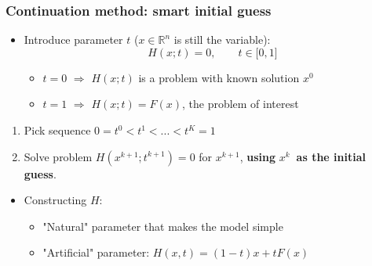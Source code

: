 \documentclass[bigger]{beamer}
\begin{document}
\begin{frame}%
\frametitle{Continuation method: smart initial guess}

\begin{itemize}
\item Introduce parameter $t$ ($x\in \mathbb{R}^{n}$ is still the variable):%
\begin{equation*}
H(x;t)=0,\qquad t\in \lbrack 0,1]
\end{equation*}

\begin{itemize}
\item $t=0$ $\Longrightarrow $ $H(x;t)$ is a problem with known solution $%
x^{0}$

\item $t=1$ $\Longrightarrow $ $H(x;t)=F(x)$, the problem of interest
\end{itemize}
\end{itemize}

\begin{enumerate}
\item Pick sequence $0=t^{0}<t^{1}<...<t^{K}=1$

\item Solve problem $H(x^{k+1};t^{k+1})=0$ for $x^{k+1}$, \newline
\textbf{using }$x^{k}$\textbf{\ as the initial guess}.
\end{enumerate}

\begin{itemize}
\item Constructing $H$:

\begin{itemize}
\item "Natural" parameter that makes the model simple

\item "Artificial" parameter: $H(x,t)=(1-t)x+tF(x)$
\end{itemize}
\end{itemize}


\end{frame}%
\end{document}
